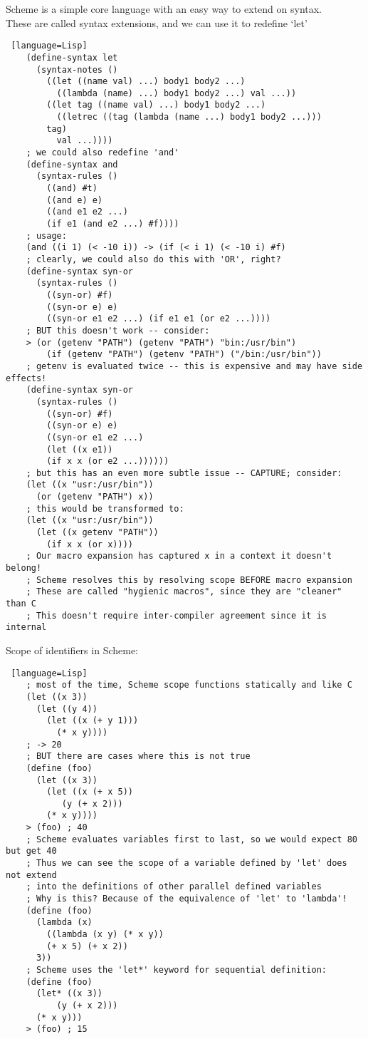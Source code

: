 \documentclass[../../lecture_notes.tex]{subfiles}
\begin{document}
\noindent Scheme is a simple core language with an easy way to extend on syntax.\\
These are called syntax extensions, and we can use it to redefine ‘let’
\begin{lstlisting} [language=Lisp]
	(define-syntax let
	  (syntax-notes ()
	    ((let ((name val) ...) body1 body2 ...)
	      ((lambda (name) ...) body1 body2 ...) val ...))
		((let tag ((name val) ...) body1 body2 ...)
		  ((letrec ((tag (lambda (name ...) body1 body2 ...)))
		tag)
	      val ...))))
	; we could also redefine 'and'
	(define-syntax and
	  (syntax-rules ()
	    ((and) #t)
	    ((and e) e)
	    ((and e1 e2 ...)
	    (if e1 (and e2 ...) #f))))
	; usage:
	(and ((i 1) (< -10 i)) -> (if (< i 1) (< -10 i) #f)
	; clearly, we could also do this with 'OR', right?
	(define-syntax syn-or
	  (syntax-rules ()
	    ((syn-or) #f)
	    ((syn-or e) e)
	    ((syn-or e1 e2 ...) (if e1 e1 (or e2 ...))))
	; BUT this doesn't work -- consider:
	> (or (getenv "PATH") (getenv "PATH") "bin:/usr/bin")
	    (if (getenv "PATH") (getenv "PATH") ("/bin:/usr/bin"))
	; getenv is evaluated twice -- this is expensive and may have side effects!
	(define-syntax syn-or
	  (syntax-rules ()
	    ((syn-or) #f)
	    ((syn-or e) e)
	    ((syn-or e1 e2 ...)
	    (let ((x e1))
	    (if x x (or e2 ...))))))
	; but this has an even more subtle issue -- CAPTURE; consider:
	(let ((x "usr:/usr/bin"))
	  (or (getenv "PATH") x))
	; this would be transformed to:
	(let ((x "usr:/usr/bin"))
	  (let ((x getenv "PATH"))
	    (if x x (or x))))
	; Our macro expansion has captured x in a context it doesn't belong!
	; Scheme resolves this by resolving scope BEFORE macro expansion
	; These are called "hygienic macros", since they are "cleaner" than C
	; This doesn't require inter-compiler agreement since it is internal
\end{lstlisting} \medskip

\noindent Scope of identifiers in Scheme:
\begin{lstlisting} [language=Lisp]
	; most of the time, Scheme scope functions statically and like C
	(let ((x 3))
	  (let ((y 4))
	    (let ((x (+ y 1)))
	      (* x y))))
	; -> 20
	; BUT there are cases where this is not true
	(define (foo)
	  (let ((x 3))
	    (let ((x (+ x 5))
		   (y (+ x 2)))
		(* x y))))
	> (foo) ; 40
	; Scheme evaluates variables first to last, so we would expect 80 but get 40
	; Thus we can see the scope of a variable defined by 'let' does not extend
	; into the definitions of other parallel defined variables
	; Why is this? Because of the equivalence of 'let' to 'lambda'!
	(define (foo)
	  (lambda (x)
	    ((lambda (x y) (* x y))
	    (+ x 5) (+ x 2))
	  3))
	; Scheme uses the 'let*' keyword for sequential definition:
	(define (foo)
	  (let* ((x 3))
		  (y (+ x 2)))
	  (* x y)))
	> (foo) ; 15
\end{lstlisting}
\end{document}
